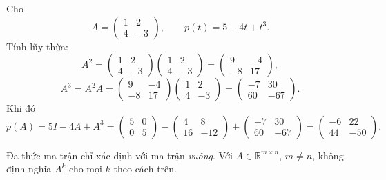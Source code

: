 \documentclass[12pt,a4paper]{article}
\begin{document}
\begin{vidu}[title={Tính $p(A)$ khi $p(t) = 5 - 4t + t^3$}]
Cho
\[
  A = \begin{pmatrix}1 & 2\\ 4 & -3\end{pmatrix},\qquad
  p(t) = 5 - 4t + t^3.
\]
Tính lũy thừa:
\[
  A^2 = \begin{pmatrix}1 & 2\\ 4 & -3\end{pmatrix}
        \begin{pmatrix}1 & 2\\ 4 & -3\end{pmatrix}
      = \begin{pmatrix}9 & -4\\ -8 & 17\end{pmatrix},
\]
\[
  A^3 = A^2 A = \begin{pmatrix}9 & -4\\ -8 & 17\end{pmatrix}
              \begin{pmatrix}1 & 2\\ 4 & -3\end{pmatrix}
            = \begin{pmatrix}-7 & 30\\ 60 & -67\end{pmatrix}.
\]
Khi đó
\[
  p(A) = 5I - 4A + A^3
  = \begin{pmatrix}5 & 0\\ 0 & 5\end{pmatrix}
  - \begin{pmatrix}4 & 8\\ 16 & -12\end{pmatrix}
  + \begin{pmatrix}-7 & 30\\ 60 & -67\end{pmatrix}
  = \begin{pmatrix}-6 & 22\\ 44 & -50\end{pmatrix}.
\]
\end{vidu}

\begin{luuy}
Đa thức ma trận chỉ xác định với ma trận \emph{vuông}. Với $A \in \mathbb{R}^{m\times n}$, $m \ne n$, không định nghĩa $A^k$ cho mọi $k$ theo cách trên.
\end{luuy}
\end{document}
